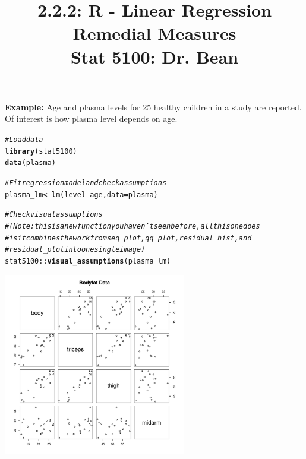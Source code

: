 \documentclass{article}\usepackage[]{graphicx}\usepackage[]{color}
\makeatletter
\newcommand{\hlcom}[1]{\textcolor[rgb]{0.678,0.584,0.686}{\textit{#1}}}%
\newcommand{\hlopt}[1]{\textcolor[rgb]{0,0,0}{#1}}%
\newcommand{\hlstd}[1]{\textcolor[rgb]{0.345,0.345,0.345}{#1}}%
\newcommand{\hlkwb}[1]{\textcolor[rgb]{0.69,0.353,0.396}{#1}}%
\newcommand{\hlkwc}[1]{\textcolor[rgb]{0.333,0.667,0.333}{#1}}%
\newcommand{\hlkwd}[1]{\textcolor[rgb]{0.737,0.353,0.396}{\textbf{#1}}}%
\newenvironment{kframe}{%
 \def\at@end@of@kframe{}%
 \ifinner\ifhmode%
  \def\at@end@of@kframe{\end{minipage}}%
  \begin{minipage}{\columnwidth}%
 \fi\fi%
 \def\FrameCommand##1{\hskip\@totalleftmargin \hskip-\fboxsep
 \colorbox{shadecolor}{##1}\hskip-\fboxsep
     \hskip-\linewidth \hskip-\@totalleftmargin \hskip\columnwidth}%
 \MakeFramed {\advance\hsize-\width
   \@totalleftmargin\z@ \linewidth\hsize
   \@setminipage}}%
 {\par\unskip\endMakeFramed%
 \at@end@of@kframe}
\newenvironment{knitrout}{}{} %
\makeatother
\begin{document}
\title{%
  2.2.2: R - Linear Regression Remedial Measures\\
  \smallskip
  \large Stat 5100: Dr. Bean
}
\date{}

\maketitle

\textbf{Example: } Age and plasma levels for 25 healthy children in a study are reported. Of interest is how plasma level depends on age.

\begin{knitrout}
\color{fgcolor}\begin{kframe}
\begin{alltt}
\hlcom{# Load data}
\hlkwd{library}\hlstd{(stat5100)}
\hlkwd{data}\hlstd{(plasma)}

\hlcom{# Fit regression model and check assumptions}
\hlstd{plasma_lm} \hlkwb{<-} \hlkwd{lm}\hlstd{(level} \hlopt{~} \hlstd{age,} \hlkwc{data} \hlstd{= plasma)}

\hlcom{# Check visual assumptions}
\hlcom{# (Note: this is a new function you haven't seen before, all this one does}
\hlcom{# is it combines the work from seq_plot, qq_plot, residual_hist, and}
\hlcom{# residual_plot into one single image)}
\hlstd{stat5100}\hlopt{::}\hlkwd{visual_assumptions}\hlstd{(plasma_lm)}
\end{alltt}
\end{kframe}

{\centering \includegraphics[width=0.6\textwidth]{figure/unnamed-chunk-1-1} 

}



\end{knitrout}
\end{document}

